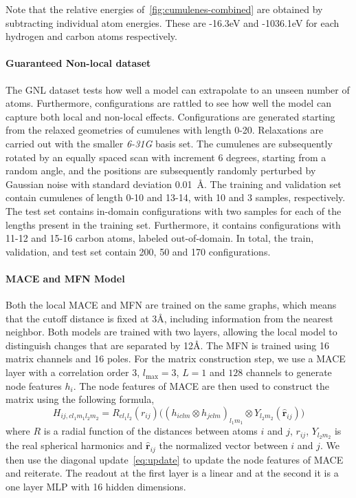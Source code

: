 \documentclass{article} \usepackage{iclr2024_conference,times}
\begin{document}
Note that the relative energies of~\ref{fig:cumulenes-combined} are obtained by subtracting individual atom energies. These are -16.3eV and -1036.1eV for each hydrogen and carbon atoms respectively.


\paragraph{Guaranteed Non-local dataset}

The GNL dataset tests how well a model can extrapolate to an unseen number of atoms. Furthermore, configurations are rattled to see how well the model can capture both local and non-local effects. Configurations are generated starting from the relaxed geometries of cumulenes with length 0-20. Relaxations are carried out with the smaller \textit{6-31G} basis set. The cumulenes are subsequently rotated by an equally spaced scan with increment 6 degrees, starting from a random angle, and the positions are subsequently randomly perturbed by Gaussian noise with standard deviation 0.01~\AA{}. The training and validation set contain cumulenes of length 0-10 and 13-14, with 10 and 3 samples, respectively. The test set contains in-domain configurations with two samples for each of the lengths present in the training set. Furthermore, it contains configurations with 11-12 and 15-16 carbon atoms, labeled out-of-domain. In total, the train, validation, and test set contain 200, 50 and 170 configurations.  


\paragraph{MACE and MFN Model}
Both the local MACE and MFN are trained on the same graphs, which means that the cutoff distance is fixed at 3\AA{}, including information from the nearest neighbor. Both models are trained with two layers, allowing the local model to distinguish changes that are separated by 12\AA{}. The MFN is trained using 16 matrix channels and 16 poles. For the matrix construction step, we use a MACE~\cite{Batatia2022mace} layer with a correlation order 3, $l_{\text{max}} = 3$, $L=1$ and $128$ channels to generate node features $h_{i}$. The node features of MACE are then used to construct the matrix using the following formula,
\begin{equation}
H_{ij,cl_{1}m_{1}l_{2}m_{2}} = R_{cl_{1}l_{2}}(r_{ij})\big( (h_{iclm} \otimes h_{jclm})_{l_{1}m_{1}} \otimes Y_{l_{2}m_{2}}(\bm{\hat{r}}_{ij}) \big)
\end{equation}
where $R$ is a radial function of the distances between atoms $i$ and $j$, $r_{ij}$, $Y_{l_{2}m_{2}}$ is the real spherical harmonics and $\bm{\hat{r}}_{ij}$ the normalized vector between $i$ and $j$. We then use the diagonal update~\ref{eq:update} to update the node features of MACE and reiterate. The readout at the first layer is a linear and at the second it is a one layer MLP with 16 hidden dimensions.
\end{document}

